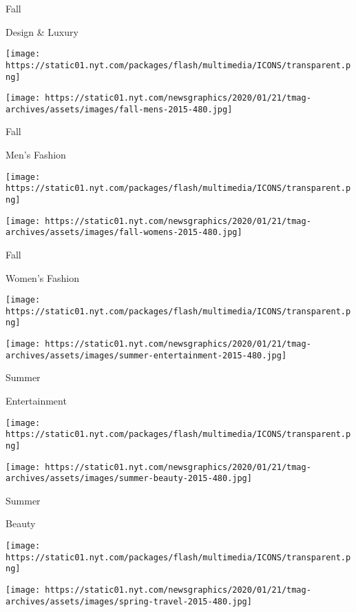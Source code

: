 Fall

Design \& Luxury

\href{https://www.nytimes.com/interactive/2015/09/11/t-magazine/fall-men-style-issue.html}{}

\texttt{[image: https://static01.nyt.com/packages/flash/multimedia/ICONS/transparent.png]}

\texttt{[image: https://static01.nyt.com/newsgraphics/2020/01/21/tmag-archives/assets/images/fall-mens-2015-480.jpg]}

Fall

Men's Fashion

\href{https://www.nytimes.com/interactive/2015/08/23/t-magazine/fall-womens-fashion-issue-collection.html}{}

\texttt{[image: https://static01.nyt.com/packages/flash/multimedia/ICONS/transparent.png]}

\texttt{[image: https://static01.nyt.com/newsgraphics/2020/01/21/tmag-archives/assets/images/fall-womens-2015-480.jpg]}

Fall

Women's Fashion

\href{https://www.nytimes.com/indexes/2015/07/19/t-magazine/design-issue/index.html}{}

\texttt{[image: https://static01.nyt.com/packages/flash/multimedia/ICONS/transparent.png]}

\texttt{[image: https://static01.nyt.com/newsgraphics/2020/01/21/tmag-archives/assets/images/summer-entertainment-2015-480.jpg]}

Summer

Entertainment

\href{https://www.nytimes.com/indexes/2015/06/14/t-magazine/womens-fashion-issue/index.html}{}

\texttt{[image: https://static01.nyt.com/packages/flash/multimedia/ICONS/transparent.png]}

\texttt{[image: https://static01.nyt.com/newsgraphics/2020/01/21/tmag-archives/assets/images/summer-beauty-2015-480.jpg]}

Summer

Beauty

\href{https://www.nytimes.com/indexes/2015/05/17/t-magazine/travel-issue/index.html}{}

\texttt{[image: https://static01.nyt.com/packages/flash/multimedia/ICONS/transparent.png]}

\texttt{[image: https://static01.nyt.com/newsgraphics/2020/01/21/tmag-archives/assets/images/spring-travel-2015-480.jpg]}

